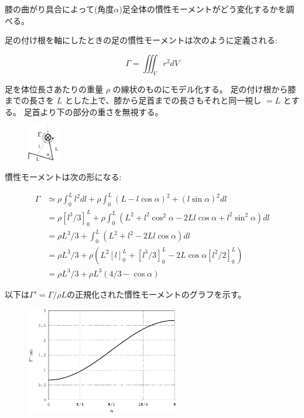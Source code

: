 \documentclass[11pt]{article}
\begin{document}
膝の曲がり具合によって(角度$\alpha$)足全体の慣性モーメントがどう変化するかを調べる。

足の付け根を軸にしたときの足の慣性モーメントは次のように定義される:

$$ \Gamma = \iiint_V r^2 dV $$

足を体位長さあたりの重量 $\rho$ の線状のものにモデル化する。
足の付け根から膝までの長さを $L$ とした上で、膝から足首までの長さもそれと同一視し $=L$ とする。 足首より下の部分の重さを無視する。

\begin{figure}[h!]
\centering
\includegraphics[width=0.12\textwidth]{leg_model.eps}
\end{figure}
慣性モーメントは次の形になる:

\begin{equation}
\begin{split}
\Gamma & \simeq \rho\int_0^L l^2 dl + \rho\int_0^L (L - l\cos\alpha)^2 + (l\sin\alpha)^2 dl\\
 & = \rho\left[l^3/3\right]_0^L + \rho\int_0^L (L^2 + l^2\cos^2\alpha - 2Ll\cos\alpha + l^2\sin^2\alpha) dl\\
 & = \rho L^3/3 + \int_0^L (L^2 + l^2 - 2Ll\cos\alpha) dl\\
 & = \rho L^3/3 + \rho\left(L^2\left[l\right]_0^L + \left[l^3/3\right]_0^L - 2L\cos\alpha\left[l^2/2\right]_0^L \right)\\
 & = \rho L^3/3 + \rho L^3\left(4/3 - \cos\alpha  \right)
\end{split}
\end{equation}

以下は$\Gamma'=\Gamma/\rho{}L$の正規化された慣性モーメントのグラフを示す。

\begin{figure}[h!]
\centering
\includegraphics[width=0.6\textwidth]{plot.eps}
\end{figure}
\end{document}
